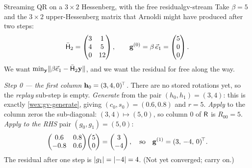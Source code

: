 \begin{workedexample}{Streaming QR on a $3\times2$ Hessenberg, with the free residual}{gv-stream}
Take $\beta = 5$ and the $3\times2$ upper-Hessenberg matrix that Arnoldi might have
produced after two steps:
\[
  \bar{\mathsf{H}}_2 = \begin{pmatrix} 3 & 1 \\ 4 & 5 \\ 0 & 12 \end{pmatrix},
  \qquad \mathbf{g}^{(0)} = \beta\,\vec e_1 = \begin{pmatrix} 5 \\ 0 \\ 0 \end{pmatrix}.
\]
We want $\min_{\mathbf{y}}\lVert\beta\vec e_1 - \bar{\mathsf{H}}_2\mathbf{y}\rVert$, and we want the residual for
free along the way.

\medskip\emph{Step 0 --- the first column} $\mathbf{h}_0 = (3,4,0)^{\!\top}$.
There are no stored rotations yet, so the \emph{replay} sub-step is empty. \emph{Generate}
from the pair $(h_0, h_1) = (3,4)$: this is exactly \cref{wex:gv-generate}, giving
$(c_0, s_0) = (0.6, 0.8)$ and $r = 5$. \emph{Apply} to the column zeros the
sub-diagonal: $(3,4)\mapsto(5,0)$, so column 0 of $\mathsf{R}$ is $R_{00} = 5$. \emph{Apply
to the RHS} pair $(g_0, g_1) = (5,0)$:
\[
  \begin{pmatrix} 0.6 & 0.8 \\ -0.8 & 0.6 \end{pmatrix}\!\begin{pmatrix} 5 \\ 0 \end{pmatrix}
  = \begin{pmatrix} 3 \\ -4 \end{pmatrix},
  \quad\text{so}\quad \mathbf{g}^{(1)} = (3,\,-4,\,0)^{\!\top}.
\]
The residual after one step is $\lvert g_1\rvert = \lvert-4\rvert = 4$. (Not yet converged; carry on.)


\end{workedexample}
